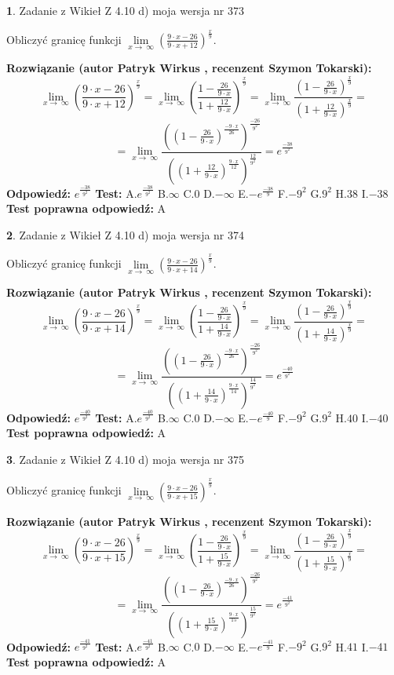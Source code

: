 \documentclass[12pt, a4paper]{article}
\theoremstyle{definition} %
\newtheorem{zad}{}
\newcommand{\zadStart}[1]{\begin{zad}#1\newline}
\newcommand{\zadStop}{\end{zad}}
\newcommand{\rozwStart}[2]{\noindent \textbf{Rozwiązanie (autor #1 , recenzent #2): }\newline}
\newcommand{\rozwStop}{\newline}
\newcommand{\odpStart}{\noindent \textbf{Odpowiedź:}\newline}
\newcommand{\odpStop}{\newline}
\newcommand{\testStart}{\noindent \textbf{Test:}\newline}
\newcommand{\testStop}{\newline}
\newcommand{\kluczStart}{\noindent \textbf{Test poprawna odpowiedź:}\newline}
\newcommand{\kluczStop}{\newline}
\begin{document}
\zadStart{Zadanie z Wikieł Z 4.10 d) moja wersja nr 373}


Obliczyć granicę funkcji  $\lim\limits_{x\to\ \infty}(\frac{9\cdot x-26}{9\cdot x+12})^{\frac{x}{9}}$.
\zadStop
\rozwStart{Patryk Wirkus}{Szymon Tokarski}
$$\lim\limits_{x\to\ \infty}(\frac{9\cdot x-26}{9\cdot x+12})^{\frac{x}{9}} = \lim\limits_{x\to\ \infty}(\frac{1-\frac{26}{9\cdot x}}{1+\frac{12}{9\cdot x}})^{\frac{x}{9}}=\lim\limits_{x\to\ \infty}\frac{(1-\frac{26}{9\cdot x})^{\frac{x}{9}}}{(1+\frac{12}{9\cdot x})^{\frac{x}{9}}}=$$
$$=\lim\limits_{x\to\ \infty}\frac{((1-\frac{26}{9\cdot x})^{\frac{-9\cdot x}{26}})^{\frac{-26}{9^{2}}}}{((1+\frac{12}{9\cdot x})^{\frac{9\cdot x}{12}})^{\frac{12}{9^{2}}}}=e^{\frac{-38}{9^{2}}}$$
\rozwStop
\odpStart
$e^{\frac{-38}{9^{2}}}$
\odpStop
\testStart
A.$e^{\frac{-38}{9^{2}}}$ B.$\infty$ C.$0$ D.$-\infty$ E.$-e^{\frac{-38}{9}}$
F.$-9^{2}$ G.$9^{2}$
H.$38$
I.$-38$
\testStop
\kluczStart
A
\kluczStop



\zadStart{Zadanie z Wikieł Z 4.10 d) moja wersja nr 374}


Obliczyć granicę funkcji  $\lim\limits_{x\to\ \infty}(\frac{9\cdot x-26}{9\cdot x+14})^{\frac{x}{9}}$.
\zadStop
\rozwStart{Patryk Wirkus}{Szymon Tokarski}
$$\lim\limits_{x\to\ \infty}(\frac{9\cdot x-26}{9\cdot x+14})^{\frac{x}{9}} = \lim\limits_{x\to\ \infty}(\frac{1-\frac{26}{9\cdot x}}{1+\frac{14}{9\cdot x}})^{\frac{x}{9}}=\lim\limits_{x\to\ \infty}\frac{(1-\frac{26}{9\cdot x})^{\frac{x}{9}}}{(1+\frac{14}{9\cdot x})^{\frac{x}{9}}}=$$
$$=\lim\limits_{x\to\ \infty}\frac{((1-\frac{26}{9\cdot x})^{\frac{-9\cdot x}{26}})^{\frac{-26}{9^{2}}}}{((1+\frac{14}{9\cdot x})^{\frac{9\cdot x}{14}})^{\frac{14}{9^{2}}}}=e^{\frac{-40}{9^{2}}}$$
\rozwStop
\odpStart
$e^{\frac{-40}{9^{2}}}$
\odpStop
\testStart
A.$e^{\frac{-40}{9^{2}}}$ B.$\infty$ C.$0$ D.$-\infty$ E.$-e^{\frac{-40}{9}}$
F.$-9^{2}$ G.$9^{2}$
H.$40$
I.$-40$
\testStop
\kluczStart
A
\kluczStop



\zadStart{Zadanie z Wikieł Z 4.10 d) moja wersja nr 375}


Obliczyć granicę funkcji  $\lim\limits_{x\to\ \infty}(\frac{9\cdot x-26}{9\cdot x+15})^{\frac{x}{9}}$.
\zadStop
\rozwStart{Patryk Wirkus}{Szymon Tokarski}
$$\lim\limits_{x\to\ \infty}(\frac{9\cdot x-26}{9\cdot x+15})^{\frac{x}{9}} = \lim\limits_{x\to\ \infty}(\frac{1-\frac{26}{9\cdot x}}{1+\frac{15}{9\cdot x}})^{\frac{x}{9}}=\lim\limits_{x\to\ \infty}\frac{(1-\frac{26}{9\cdot x})^{\frac{x}{9}}}{(1+\frac{15}{9\cdot x})^{\frac{x}{9}}}=$$
$$=\lim\limits_{x\to\ \infty}\frac{((1-\frac{26}{9\cdot x})^{\frac{-9\cdot x}{26}})^{\frac{-26}{9^{2}}}}{((1+\frac{15}{9\cdot x})^{\frac{9\cdot x}{15}})^{\frac{15}{9^{2}}}}=e^{\frac{-41}{9^{2}}}$$
\rozwStop
\odpStart
$e^{\frac{-41}{9^{2}}}$
\odpStop
\testStart
A.$e^{\frac{-41}{9^{2}}}$ B.$\infty$ C.$0$ D.$-\infty$ E.$-e^{\frac{-41}{9}}$
F.$-9^{2}$ G.$9^{2}$
H.$41$
I.$-41$
\testStop
\kluczStart
A
\kluczStop
\end{document}

